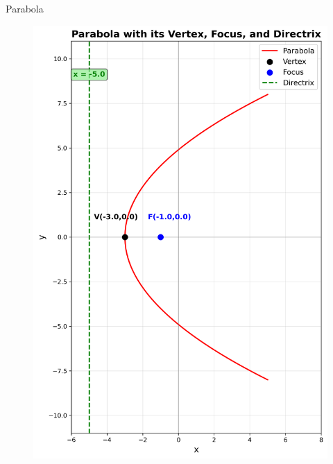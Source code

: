 \documentclass{beamer}
\begin{document}
\begin{frame}{Parabola}
\begin{figure}
   \centering
    \includegraphics[width=\columnwidth, height=0.8\textheight, keepaspectratio]{figs/fig2.png}
    \label{fig:Beamer/figs/fig2.png}
\end{figure}
\end{frame}
\end{document}
